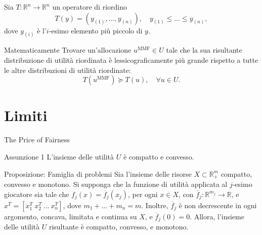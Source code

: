 \documentclass{beamer}
\begin{document}
\begin{frame}
	Sia $T: \mathbb{R}^n \rightarrow \mathbb{R}^n$ un operatore di riordino
	\begin{equation*}
		T(y) = (y_{(1)}, \dots, y_{(n)}), \quad y_{(1)} \le \dots \le y_{(n)},
	\end{equation*}
	dove $y_{(i)}$ è l'$i$-esimo elemento più piccolo di $y$. 
	\begin{block}{Matematicamente}
		Trovare un'allocazione $u^{\text{MMF}} \in U$ tale che la sua risultante distribuzione di utilità riordinata è lessicograficamente più grande rispetto a tutte le altre distribuzioni di utilità riordinate:
		\begin{equation}
			T(u^{\text{MMF}}) \succeq T(u), \quad \forall u \in U.
		\end{equation}
	\end{block}
\end{frame}


\section{Limiti}

\begin{frame}{The Price of Fairness}
	\begin{block}{Assunzione 1} \label{A1}
		L'insieme delle utilità $U$ è compatto e convesso.
	\end{block}
\begin{exampleblock}{Proposizione: Famiglia di problemi}
	Sia l'insieme delle risorse $X \subset \mathbb{R}^m_+$ compatto, convesso e monotono. Si supponga che la funzione di utilità applicata al $j$-esimo giocatore sia tale che $f_j(x) = \overline{f}_j(x_j)$, per ogni $x \in X$, con $\overline{f}_j: \mathbb{R}^{m_j} \rightarrow \mathbb{R}$, e $x^T = [x_1^T \ x_2^T \ \dots \ x_n^T]$, dove $m_1+\dots+m_n=m$. Inoltre, $\overline{f}_j$ è non decrescente in ogni argomento, concava, limitata e continua su $X$, e $\overline{f}_j(0)=0$. Allora, l'insieme delle utilità $U$ risultante è compatto, convesso, e monotono.
\end{exampleblock}
\end{frame}
\end{document}
